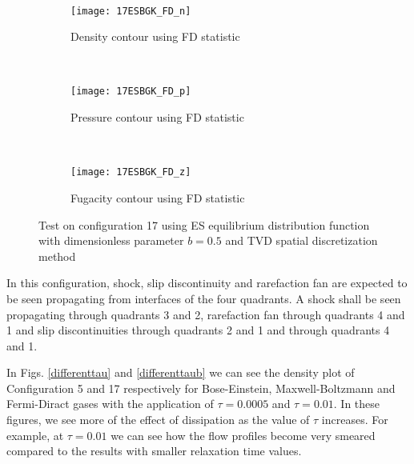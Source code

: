 \documentclass{rsproca}%
\begin{document}
\begin{figure}
\begin{subfigure}[b]{0.32\textwidth}
                \label{fig:17ESBGK_MB_z}
        \end{subfigure}
        ~ %
        \begin{subfigure}[b]{0.32\textwidth}
                \centering
                \texttt{[image: 17ESBGK\_FD\_n]}
                \caption{Density contour using FD statistic}
                \label{fig:17ESBGK_FD_n}
        \end{subfigure}
        ~ %
        \begin{subfigure}[b]{0.32\textwidth}
                \centering
                \texttt{[image: 17ESBGK\_FD\_p]}
                \caption{Pressure contour using FD statistic}
                \label{fig:17ESBGK_FD_p}
        \end{subfigure}
				~ %
        \begin{subfigure}[b]{0.32\textwidth}
                \centering
                \texttt{[image: 17ESBGK\_FD\_z]}
                \caption{Fugacity contour using FD statistic}
                \label{fig:17ESBGK_FD_z}
        \end{subfigure}
				\caption{Test on configuration 17 using ES equilibrium distribution function with dimensionless parameter $b=0.5$ and TVD spatial discretization method} \label{fig:test_configuration17}
\end{figure}


In this configuration, shock, slip discontinuity and rarefaction fan are expected to be seen propagating from interfaces of the four quadrants. A shock shall be seen propagating through quadrants 3 and 2, rarefaction fan through quadrants 4 and 1 and slip discontinuities through quadrants 2 and 1 and through quadrants 4 and 1.

In Figs. \ref{differenttau} and \ref{differenttaub}  we can see the density plot of Configuration 5 and 17 respectively for Bose-Einstein,  Maxwell-Boltzmann and Fermi-Diract gases with the application of $\tau=0.0005$ and $\tau=0.01$. In these figures, we see more of the effect of dissipation as the value of $\tau$ increases. For example, at $\tau=0.01$ we can see how the flow profiles become very smeared compared to the results with smaller relaxation time values.
\end{document}
